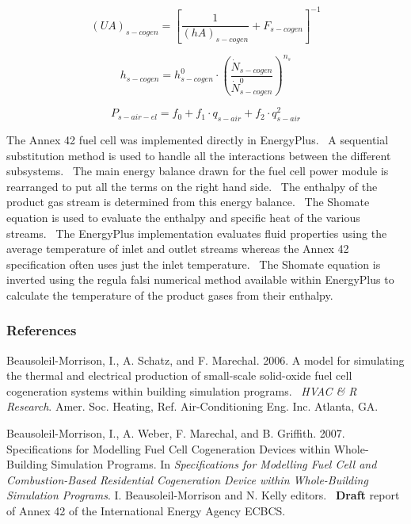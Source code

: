 \begin{equation}
{\left( {UA} \right)_{s - cogen}} = {\left[ {\frac{1}{{{{\left( {hA} \right)}_{s - cogen}}}} + {F_{s - cogen}}} \right]^{ - 1}}
\end{equation}

\begin{equation}
{h_{s - cogen}} = h_{s - cogen}^0 \cdot {\left( {\frac{{{{\dot N}_{s - cogen}}}}{{\dot N_{s - cogen}^0}}} \right)^{{n_s}}}
\end{equation}

\begin{equation}
{P_{s - air - el}} = {f_0} + {f_1} \cdot {q_{s - air}} + {f_2} \cdot q_{s - air}^2
\end{equation}

The Annex 42 fuel cell was implemented directly in EnergyPlus.~ A sequential substitution method is used to handle all the interactions between the different subsystems.~ The main energy balance drawn for the fuel cell power module is rearranged to put all the terms on the right hand side.~ The enthalpy of the product gas stream is determined from this energy balance.~ The Shomate equation is used to evaluate the enthalpy and specific heat of the various streams.~ The EnergyPlus implementation evaluates fluid properties using the average temperature of inlet and outlet streams whereas the Annex 42 specification often uses just the inlet temperature.~ The Shomate equation is inverted using the regula falsi numerical method available within EnergyPlus to calculate the temperature of the product gases from their enthalpy.

\subsubsection{References}\label{references-1-009}

Beausoleil-Morrison, I., A. Schatz, and F. Marechal. 2006. A model for simulating the thermal and electrical production of small-scale solid-oxide fuel cell cogeneration systems within building simulation programs.~ \emph{HVAC \& R Research}. Amer. Soc. Heating, Ref. Air-Conditioning Eng. Inc. Atlanta, GA.

Beausoleil-Morrison, I., A. Weber, F. Marechal, and B. Griffith. 2007. Specifications for Modelling Fuel Cell Cogeneration Devices within Whole-Building Simulation Programs. In \emph{Specifications for Modelling Fuel Cell and Combustion-Based Residential Cogeneration Device within Whole-Building Simulation Programs}. I. Beausoleil-Morrison and N. Kelly editors.~ \textbf{Draft} report of Annex 42 of the International Energy Agency ECBCS.

